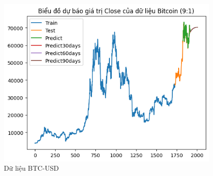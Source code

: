 \documentclass[conference]{IEEEtran}
\begin{document}
\begin{figure}[H]
\begin{minipage}{0.15\textwidth}
			\includegraphics[width=1\textwidth]{Figure/GRU_BTC_91.png}
		\end{minipage}
		\caption{Dữ liệu BTC-USD}
		\label{fig:1}
	\end{figure}
	
\end{document}
